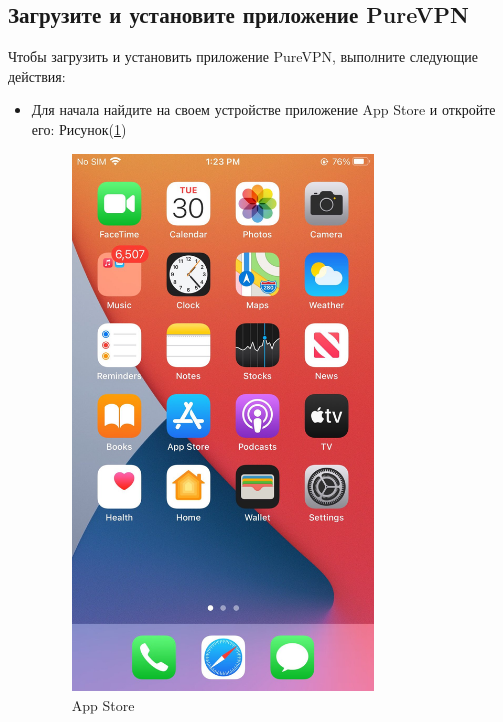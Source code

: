 \subsection{Загрузите и установите приложение PureVPN} 
Чтобы загрузить и установить приложение PureVPN, выполните следующие действия:
\begin{itemize}
\item Для начала найдите на своем устройстве приложение App Store и откройте его:  Рисунок(\ref{fig:56})
\begin{figure}[H]
\includegraphics[width=8cm]{42.png}
\centering
\caption{App Store}
\label{fig:56}
\end{figure}


\end{itemize}

